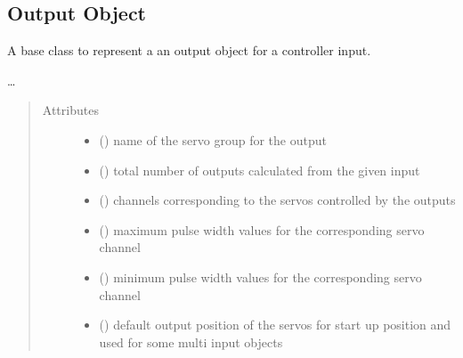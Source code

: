 \documentclass[letterpaper,10pt,english]{sphinxmanual}
\begin{document}
\subsection{Output Object}
\label{\detokenize{base:module-OutputObject}}\label{\detokenize{base:output-object}}

\begin{fulllineitems}
\label{\detokenize{base:OutputObject.OutputObject}}
\sphinxAtStartPar
A base class to represent a an output object for a controller input.

\sphinxAtStartPar
…
\begin{quote}\begin{description}
\item[{Attributes}] \leavevmode\begin{itemize}
\item {} 
\sphinxAtStartPar
{}() \textendash{} name of the servo group for the output

\item {} 
\sphinxAtStartPar
{}() \textendash{} total number of outputs 
calculated from the given input

\item {} 
\sphinxAtStartPar
{}(\sphinxstyleemphasis{{[}int{]}}) \textendash{} channels corresponding to 
the servos controlled by the outputs

\item {} 
\sphinxAtStartPar
{}(\sphinxstyleemphasis{{[}int{]}}) \textendash{} maximum pulse width values 
for the corresponding servo channel

\item {} 
\sphinxAtStartPar
{}(\sphinxstyleemphasis{{[}int{]}}) \textendash{} minimum pulse width values 
for the corresponding servo channel

\item {} 
\sphinxAtStartPar
{}(\sphinxstyleemphasis{{[}int{]}}) \textendash{} default output position of 
the servos for start up position and used for some multi input 
objects


\end{itemize}
\end{description}
\end{quote}
\end{fulllineitems}
\end{document}
